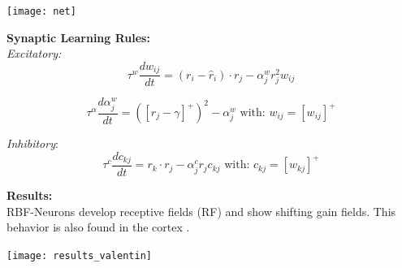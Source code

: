 \documentclass[portrait,final,a0paper,fontscale=0.33]{baposter}
\begin{document}
\begin{poster}
{\begin{adjustbox}{minipage=0.95\textwidth, margin=5pt, center}
\begin{minipage}[r]{0.3\textwidth}
		\begin{center}
			\texttt{[image: net]}
		\end{center}
		
		\vspace{10pt}
		
		\textbf{Synaptic Learning Rules:} \\
		
		\textit{Excitatory:} 
		\footnotesize
		$$\tau^{ w }\frac{ dw_{ ij } }{ dt } = (r_{ i }-\hat r_{ i }) \cdot r_{j}-\alpha^{w}_{j}r^{2}_{j}w_{ij}$$

		$$\tau^{ \alpha }\frac{ d \alpha^{w}_{j}}{ dt } = \left( \left[ r_{j} - \gamma\right]^{+} \right)^{2} - \alpha^{w}_{j} \text{  with:  }  w_{ij} = \left[w_{ij} \right]^{+}$$
		
		
	\end{minipage}
	\hfill
	\begin{minipage}[r]{0.33\textwidth}
		\textit{Inhibitory}:
		\footnotesize
		$$\tau^{ c }\frac{ dc_{ kj } }{ dt } = r_{ k } \cdot r_{ j } -\alpha^{c}_{j}r_{j}c_{kj}
		\text{  with:  }  c_{kj} = \left[w_{kj} \right]^{+}$$
		
		\vspace{5pt}
		\small
		\textbf{Results:} \\
		RBF-Neurons develop receptive fields (RF) and show shifting gain
		fields.	This behavior is also found in the cortex \parencite{pougetComputationalPerspectiveNeural2002}.
		
		\vspace{10pt}
		
		\begin{center}
			\texttt{[image: results\_valentin]}
		\end{center}

		\hfill
	\end{minipage}

	\end{adjustbox}
}


\end{poster}
\end{document}
